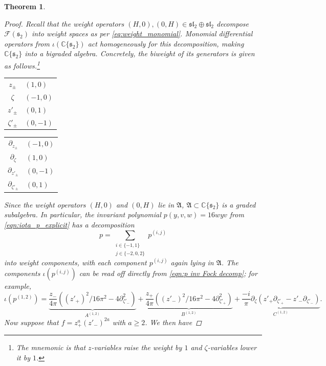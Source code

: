 \documentclass[reqno, 11pt]{amsart} %
\numberwithin{equation}{section}
\theoremstyle{plain}
\newtheorem{theorem}{Theorem}[section]
\theoremstyle{definition}
\theoremstyle{remark}
\newcommand{\mbC}{\mathbb{C}}
\newcommand{\mcF}{\mathcal{F}}
\newcommand{\mfA}{\mathfrak{A}}
\newcommand{\mfs}{\mathfrak{s}}
\newcommand{\lie}[1]{ \mathfrak{#1}}
\begin{document}
\begin{theorem}
\begin{proof}
Recall that the weight operators $(H,0), (0,H) \in \lie{sl}_2 \oplus \lie{sl}_2$ decompose $\mcF(\mfs_2)$ into weight spaces as per \eqref{eq:weight_monomial}. Monomial differential operators from $ι(\mbC\{\mfs_2\})$ act homogeneously for this decomposition, making $\mbC\{\mfs_2\}$ into a bigraded algebra. Concretely, the biweight of its generators is given as follows.\footnote{The mnemonic is that $z$-variables raise the weight by $1$ and $ζ$-variables lower it by $1$.}
\begin{center}
\def\arraystretch{1.2}
\begin{minipage}{3cm}
\begin{tabular}{|c|l|}
	\hline
	$z_\pm$ & $(1, 0)$\\
	$ζ$ & $(-1,0)$\\
	$z'_{\pm}$ & $(0,1)$\\
	$ζ'_{\pm}$ & $(0,-1)$\\
	\hline
\end{tabular}
\end{minipage}
\begin{minipage}{2.5cm}
\begin{tabular}{|c|l|}
	\hline
	$\partial_{z_\pm}$ & $(-1, 0)$\\
	$\partial_ζ$ & $(1,0)$\\
	$\partial_{z'_{\pm}}$ & $(0,-1)$\\
	$\partial_{ζ'_{\pm}}$ & $(0,1)$\\
	\hline
\end{tabular}
\end{minipage}
\end{center}
Since the weight operators $(H, 0)$ and $(0,H)$ lie in $\mfA$, $\mfA \subset \mbC\{\mfs_2\}$ is a graded subalgebra. In particular, the invariant polynomial $p(y,v,w) = 16wyv$ from \eqref{eqn:iota_p_explicit} has a decomposition
\[
p  = \sum_{ \substack{i \in \{ -1, 1\} \\ j \in \{ -2, 0, 2\} }} p^{(i,j)}
\]
into weight components, with each component $p^{(i,j)}$ again lying in $\mfA$. The components $ι(p^{(i,j)})$ can be read off directly from \eqref{eqn:p inv Fock decomp}; for example,
\[
\iota\left(p^{(1, 2)}\right) = \underset{A^{(1,2)}}{\underbrace{\frac{z_-}{4π} \left(  (z'_+)^2/16 \pi ^2 - 4 \partial^2_{\zeta'_-}\right)}}
+ \underset{B^{(1,2)}}{\underbrace{\frac{z_+}{4π} \left( (z'_-)^2/16\pi^2 - 4 \partial^2_{\zeta'_+}\right)}}
+ \underset{C^{(1,2)}}{\underbrace{\frac{-i}{\pi} \partial_{\zeta} { (z'_+ \partial_{\zeta'_+} - z'_- \partial_{\zeta'_-})}}}.
\]
Now suppose that $f = z_+^a (z'_-)^{2a}$ with $a \geq 2$. We then have

\end{proof}
\end{theorem}
\end{document}
